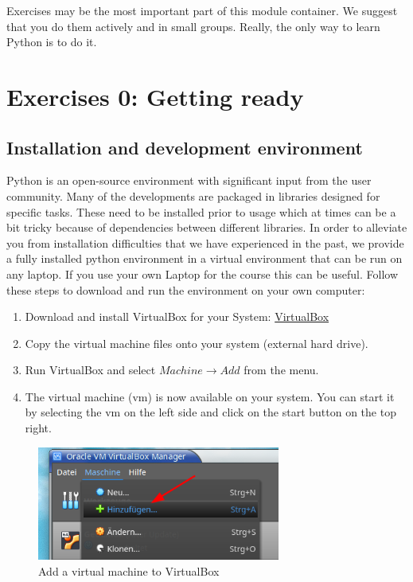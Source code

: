 \begin{tcolorbox}[enhanced jigsaw,breakable,pad at break*=1mm,
    colback=blue!5!white,colframe=babyblueeyes,title=Exercises]
    Exercises may be the most important part of this module container.
    We suggest that you do them actively and in small groups. Really, the only way to learn Python is to do it.      
\end{tcolorbox}
\section{Exercises 0: Getting ready}

\subsection{Installation and development environment}
Python is an open-source environment with significant input from the user community.
Many of the developments are packaged in libraries designed for specific tasks.
These need to be installed prior to usage which at times can be a bit tricky because of dependencies between
different libraries. In order to alleviate you from installation difficulties that we have experienced in
the past, we provide a fully installed python environment in a virtual environment that can be run on any laptop.
If you use your own Laptop for the course this can be useful. Follow these steps to download and run the environment on your own computer:\\

\begin{enumerate}
    \item Download and install VirtualBox for your System: \href{https://www.virtualbox.org/}{VirtualBox}
    \item Copy the virtual machine files onto your system (external hard drive).
    \item Run VirtualBox and select $Machine \rightarrow Add$ from the menu.
    \item The virtual machine (vm) is now available on your system. You can start it by selecting the vm on the left side and click on the start button on the top right.
\end{enumerate}

\begin{figure}[h!]
    \centering
    \includegraphics[width=8cm]{Figures/virtual_box1.png}
    \caption{Add a virtual machine to VirtualBox}
\end{figure}

